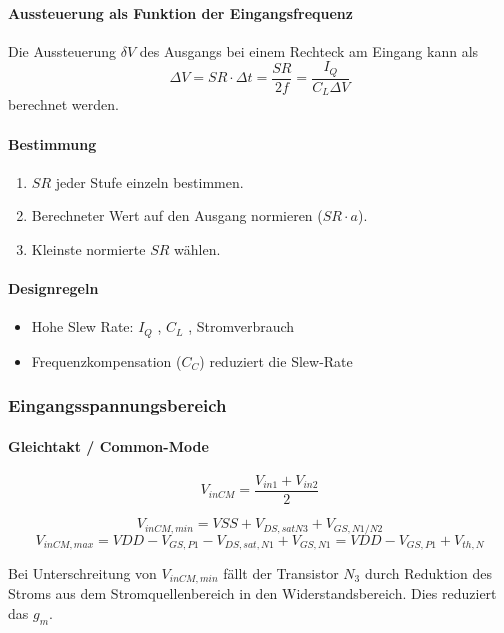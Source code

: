 \paragraph{Aussteuerung als Funktion der Eingangsfrequenz}
Die Aussteuerung $\delta V$ des Ausgangs bei einem Rechteck am Eingang kann als %
\[
    \Delta V = SR \cdot \Delta t = \frac{SR}{2 f} = \frac{I_Q}{C_L \Delta V}
\]
berechnet werden.

\paragraph{Bestimmung}
\begin{enumerate}
    \item $SR$ jeder Stufe einzeln bestimmen.
    \item Berechneter Wert auf den Ausgang normieren ($SR \cdot a$).
    \item Kleinste normierte $SR$ wählen.
\end{enumerate}

\paragraph{Designregeln}
\begin{itemize}
    \item Hohe Slew Rate: $I_Q$ \textuparrow, $C_L$ \textdownarrow, Stromverbrauch \textuparrow%
    \item Frequenzkompensation ($C_C$) reduziert die Slew-Rate
\end{itemize}


\subsubsection{Eingangsspannungsbereich}
\paragraph{Gleichtakt / Common-Mode}
\[
    V_{inCM} = \frac{V_{in1} + V_{in2}}{2}
\]

\[
    V_{inCM, min} = VSS + V_{DS,satN3} + V_{GS,N1/N2}
\]
\[
    V_{inCM, max} = VDD - V_{GS,P1} - V_{DS,sat,N1} + V_{GS,N1} = VDD - V_{GS,P1} + V_{th,N} 
\]

Bei Unterschreitung von $V_{inCM, min}$ fällt der Transistor $N_3$ durch Reduktion des Stroms aus dem Stromquellenbereich in den Widerstandsbereich. Dies reduziert das $g_m$.

